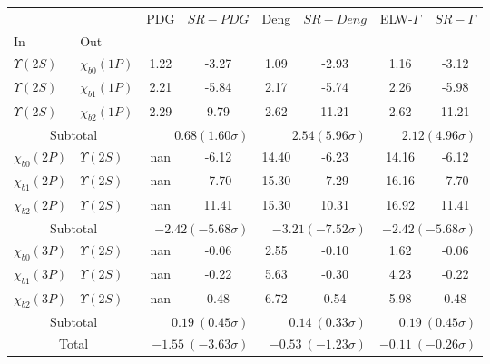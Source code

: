 \begin{tabular}{|l|l|c|c|c|c|c|c|}%
\hline%
&&PDG&$SR-PDG$&Deng&$SR-Deng$&ELW-$\Gamma$&$SR-\Gamma$\\%
In&Out&&&&&&\\%
\hline%
$\Upsilon(2S)$&$\chi_{b0}(1P)$&1.22&-3.27&1.09&-2.93&1.16&-3.12\\%
$\Upsilon(2S)$&$\chi_{b1}(1P)$&2.21&-5.84&2.17&-5.74&2.26&-5.98\\%
$\Upsilon(2S)$&$\chi_{b2}(1P)$&2.29&9.79&2.62&11.21&2.62&11.21\\%
\hline%
\hline%
\multicolumn{2}{|c|}{Subtotal}&\multicolumn{2}{|r|}{$0.68 (1.60\sigma)$}&\multicolumn{2}{|r|}{$2.54 (5.96\sigma)$}&\multicolumn{2}{|r|}{$2.12 (4.96\sigma)$}\\%
\hline%
\hline%
$\chi_{b0}(2P)$&$\Upsilon(2S)$&nan&-6.12&14.40&-6.23&14.16&-6.12\\%
$\chi_{b1}(2P)$&$\Upsilon(2S)$&nan&-7.70&15.30&-7.29&16.16&-7.70\\%
$\chi_{b2}(2P)$&$\Upsilon(2S)$&nan&11.41&15.30&10.31&16.92&11.41\\%
\hline%
\hline%
\multicolumn{2}{|c|}{Subtotal}&\multicolumn{2}{|r|}{$-2.42 (-5.68\sigma)$}&\multicolumn{2}{|r|}{$-3.21 (-7.52\sigma)$}&\multicolumn{2}{|r|}{$-2.42 (-5.68\sigma)$}\\%
\hline%
\hline%
$\chi_{b0}(3P)$&$\Upsilon(2S)$&nan&-0.06&2.55&-0.10&1.62&-0.06\\%
$\chi_{b1}(3P)$&$\Upsilon(2S)$&nan&-0.22&5.63&-0.30&4.23&-0.22\\%
$\chi_{b2}(3P)$&$\Upsilon(2S)$&nan&0.48&6.72&0.54&5.98&0.48\\%
\hline%
\hline%
\multicolumn{2}{|c|}{Subtotal}&\multicolumn{2}{|r|}{$0.19~(0.45\sigma)$}&\multicolumn{2}{|r|}{$0.14~(0.33\sigma)$}&\multicolumn{2}{|r|}{$0.19~(0.45\sigma)$}\\%
\hline%
\hline%
\multicolumn{2}{|c|}{Total}&\multicolumn{2}{|r|}{$-1.55~(-3.63\sigma)$}&\multicolumn{2}{|r|}{$-0.53~(-1.23\sigma)$}&\multicolumn{2}{|r|}{$-0.11~(-0.26\sigma)$}\\%
\hline%
\end{tabular}